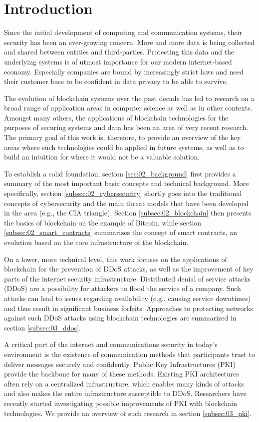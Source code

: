 \section{Introduction}

Since the initial development of computing and communication systems, their security has been an ever-growing concern. More and more data is being collected and shared between entities and third-parties. Protecting this data and the underlying systems is of utmost importance for our modern internet-based economy. Especially companies are bound by increasingly strict laws and need their customer base to be confident in data privacy to be able to survive.

The evolution of blockchain systems over the past decade has led to research on a broad range of application areas in computer science as well as in other contexts. Amongst many others, the applications of blockchain technologies for the purposes of securing systems and data has been an area of very recent research. The primary goal of this work is, therefore, to provide an overview of the key areas where such technologies could be applied in future systems, as well as to build an intuition for where it would not be a valuable solution.

To establish a solid foundation, section \ref{sec:02_background} first provides a summary of the most important basic concepts and technical background. More specifically, section \ref{subsec:02_cybersecurity} shortly goes into the traditional concepts of cybersecurity and the main threat models that have been developed in the area (e.g., the CIA triangle). Section \ref{subsec:02_blockchain} then presents the basics of blockchain on the example of Bitcoin, while section \ref{subsec:02_smart_contracts} summarizes the concept of smart contracts, an evolution based on the core infrastructure of the blockchain.

On a lower, more technical level, this work focuses on the applications of blockchain for the prevention of DDoS attacks, as well as the improvement of key parts of the internet security infrastructure. Distributed denial of service attacks (DDoS) are a possibility for attackers to flood the service of a company. Such attacks can lead to issues regarding availability (e.g., causing service downtimes) and thus result in significant business forfeits. Approaches to protecting networks against such DDoS attacks using blockchain technologies are summarized in section \ref{subsec:03_ddos}.

A critical part of the internet and communications security in today's environment is the existence of communication methods that participants trust to deliver messages securely and confidently. Public Key Infrastructures (PKI) provide the backbone for many of these methods. Existing PKI architectures often rely on a centralized infrastructure, which enables many kinds of attacks and also makes the entire infrastructure susceptible to DDoS. Researchers have recently started investigating possible improvements of PKI with blockchain technologies. We provide an overview of such research in section \ref{subsec:03_pki}.

